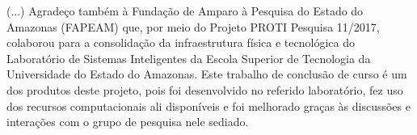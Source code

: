 (...)
Agradeço também à Fundação de Amparo à Pesquisa do Estado do Amazonas (FAPEAM) que, por meio do Projeto PROTI Pesquisa 11/2017, colaborou para a consolidação da infraestrutura física e tecnológica do Laboratório de Sistemas Inteligentes da Escola Superior de Tecnologia da Universidade do Estado do Amazonas. Este trabalho de conclusão de curso é um dos produtos deste projeto, pois foi desenvolvido no referido laboratório, fez uso dos recursos  computacionais ali disponíveis e foi melhorado graças às discussões e interações com o grupo de pesquisa nele sediado.
